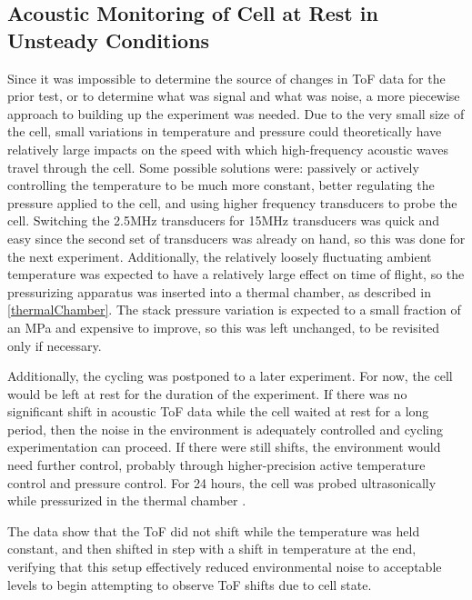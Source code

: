 \subsection{Acoustic Monitoring of Cell at Rest in Unsteady Conditions}\label{chamberTest}
Since it was impossible to determine the source of changes in ToF data for the prior test, or to determine what was signal and what was noise, a more piecewise approach to building up the experiment was needed. Due to the very small size of the cell, small variations in temperature and pressure could theoretically have relatively large impacts on the speed with which high-frequency acoustic waves travel through the cell. Some possible solutions were: passively or actively controlling the temperature to be much more constant, better regulating the pressure applied to the cell, and using higher frequency transducers to probe the cell. Switching the 2.5MHz transducers for 15MHz transducers was quick and easy since the second set of transducers was already on hand, so this was done for the next experiment. Additionally, the relatively loosely fluctuating ambient temperature was expected to have a relatively large effect on time of flight, so the pressurizing apparatus was inserted into a thermal chamber, as described in \hyperref[thermalChamber]{\cref{thermalChamber}}. The stack pressure variation is expected to a small fraction of an MPa and expensive to improve, so this was left unchanged, to be revisited only if necessary.

Additionally, the cycling was postponed to a later experiment.
For now, the cell would be left at rest for the duration of the experiment. 
If there was no significant shift in acoustic ToF data while the cell waited at rest for a long period, then the noise in the environment is adequately controlled and cycling experimentation can proceed. 
If there were still shifts, the environment would need further control, probably through higher-precision active temperature control and pressure control. 
For 24 hours, the cell was probed ultrasonically while pressurized in the thermal chamber .

The data show that the ToF did not shift while the temperature was held constant, and then shifted in step with a shift in temperature at the end, verifying that this setup effectively reduced environmental noise to acceptable levels to begin attempting to observe ToF shifts due to cell state.

